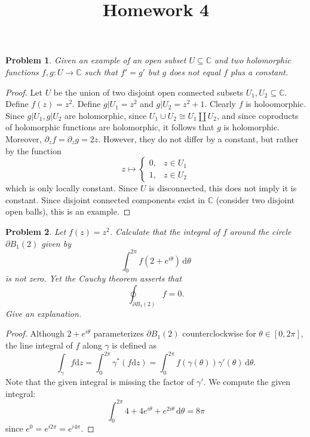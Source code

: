 \documentclass[11pt, letterpaper]{article}
\title{Homework 4}
\theoremstyle{plain}
\newtheorem{problem}{Problem}
\begin{document}
\makeproblem

\begin{problem}
	Given an example of an open subset $U\subseteq \mathbb{C} $ and two holomorphic functions $f,g : U \to \mathbb{C} $ such that $f'=g'$ but $g$ does not equal $f$ plus a constant.
\end{problem}
\begin{proof}
	Let $U$ be the union of two disjoint open connected subsets $U_1,U_2 \subseteq \mathbb{C} $. Define $f(z)=z^2$. Define $g|U_1=z^2$ and $g|U_2=z^2+1$. Clearly $f$ is holoomorphic. Since $g|U_1,g|U_2$ are holomorphic, since $U_1 \cup U_2 \cong U_1 \amalg U_2$, and since coproducts of holomorphic functions are holomorphic, it follows that $g$ is holomorphic. Moreover, $\partial _zf=\partial _zg=2z$. However, they do not differ by a constant, but rather by the function
	\[
		z\mapsto 
		\begin{cases}
			0,&z\in U_1\\
			1,&z\in U_2
		\end{cases}
	\]
	which is only locally constant. Since $U$ is disconnected, this does not imply it is constant. Since disjoint connected components exist in $\mathbb{C} $ (consider two disjoint open balls), this is an example.
\end{proof}

\begin{problem}
	Let $f(z)=z^2$. Calculate that the integral of $f$ around the circle $\partial B_1(2)$ given by
	\[
		\int_{0}^{2\pi } f(2+e^{i\theta } ) \,\mathrm{d} \theta 
	\]
	is not zero. Yet the Cauchy theorem asserts that
	\[
		\oint_{\partial B_1(2)} f =0
	.\]
	Give an explanation.
\end{problem}
\begin{proof}
	Although $2+e^{i\theta } $ parameterizes $\partial B_1(2)$ counterclockwise for $\theta \in[0,2\pi ]$, the line integral of $f$ along $\gamma $ is defined as
	\[
		\int_\gamma f\mathrm{d} z = \int_0^{2\pi } \gamma ^*(f \mathrm{d} z)=\int_{0}^{2\pi } f(\gamma (\theta ))\gamma '(\theta ) \,\mathrm{d} \theta 
	.\]
	Note that the given integral is missing the factor of $\gamma '$. We compute the given integral:
	\[
		\int_0^{2\pi } 4+4e^{i\theta } +e^{2i\theta }  \,\mathrm{d} \theta =8\pi 
	\]
	since $e^{0} =e^{i2\pi } =e^{i4\pi } $.
\end{proof}
\end{document}
